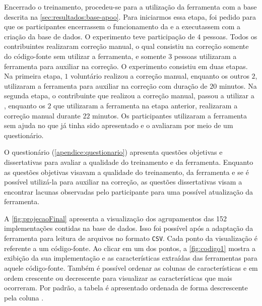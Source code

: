 		Encerrado o treinamento, procedeu-se para a utilização da ferramenta com a base
		descrita na \cref{sec:resultados:base-apoo}. Para iniciarmos essa etapa, foi
		pedido para que os participantes encerrassem o funcionamento da 
		e a executassem com a criação da base de dados. O experimento teve participação
		de $4$ pessoas. Todos os contribuintes realizaram  correção manual, o qual
		consistiu na correção somente do código-fonte sem utilizar a ferramenta, e
		somente $3$ pessoas utilizaram a ferramenta  para auxiliar
		na correção. O experimento consistiu em duas etapas. Na primeira etapa, $1$
		voluntário realizou a correção manual, enquanto os outros $2$, utilizaram a
		ferramenta para auxiliar na correção com duração de $20$ minutos. Na segunda
		etapa, o contribuinte que realizou a correção manual, passou a utilizar a
		, enquanto os $2$ que utilizaram a ferramenta na etapa
		anterior, realizaram a correção manual durante $22$ minutos. Os participantes
		utilizaram a ferramenta sem ajuda no que já tinha sido apresentado e o
		avaliaram por meio de um questionário.		
		
		O questionário (\cref{apendice:questionario}) apresenta questões objetivas e
		dissertativas para avaliar a qualidade do treinamento e da ferramenta. Enquanto
		as questões objetivas visavam a qualidade do treinamento, da ferramenta e se
		é possível utilizá-la para auxiliar na correção, as questões dissertativas
		visam a encontrar lacunas observadas pelo participante para uma possível 
		atualização da ferramenta.
		
		A \cref{fig:projecaoFinal} apresenta a visualização dos agrupamentos das 152
		implementações contidas na base de dados. Isso foi possível após a adaptação da
		ferramenta para leitura de arquivos no formato \texttt{CSV}. Cada ponto da
		visualização é referente a um código-fonte. Ao clicar em um dos pontos, a
		\cref{fig:codigo1} mostra a exibição da sua implementação e as características
		extraídas das ferramentas para aquele código-fonte. Também é possível ordenar
		as colunas de características  e  em
		ordem  crescente ou decrescente para visualizar as características que mais
		ocorreram. Por padrão, a tabela é apresentado ordenada de forma descrescente
		pela coluna .
	
